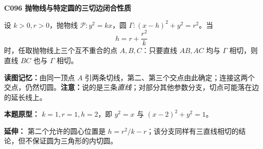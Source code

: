 \noindent\textbf{C096 抛物线与特定圆的三切边闭合性质}\par
\noindent 设 $k>0,r>0$，抛物线 $\mathcal P:y^2=kx$，圆 $\Gamma:(x-h)^2+y^2=r^2$。当
\[
\boxed{\ h=r+\frac{r^2}{k}\ }
\]
时，任取抛物线上三个互不重合的点 $A,B,C$：只要直线 $AB,AC$ 均与 $\Gamma$ 相切，则直线 $BC$ 也与 $\Gamma$ 相切。

\noindent\textbf{读图记忆：}由同一顶点 $A$ 引两条切线，第二、第三个交点由此确定；连接这两个交点，仍然切圆。\textbf{注意：}说的是三条\emph{直线}；对部分其他参数分支，切点可能落在边的延长线上。

\noindent\textbf{本题原型：} $k=1,r=1,h=2$，即 $y^2=x$ 与 $(x-2)^2+y^2=1$。

\noindent\textbf{延伸：} 第二个允许的圆心位置是 $h=r^2/k-r$；该分支同样有三直线相切的结论，但不保证圆为三角形的内切圆。\par
